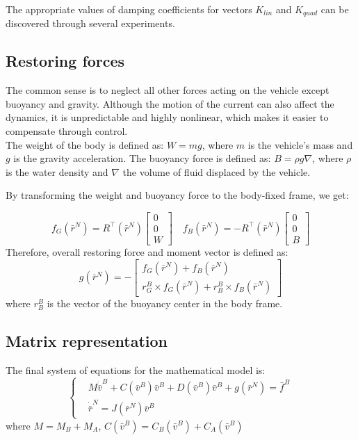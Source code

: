     The appropriate values of damping coefficients for vectors $K_{lin}$ and $K_{quad}$ can be discovered through several experiments.

\subsection{Restoring forces}

    The common sense is to neglect all other forces acting on the vehicle except buoyancy and gravity. 
    Although the motion of the current can also affect the dynamics, it is unpredictable and highly nonlinear, 
    which makes it easier to compensate through control.\\
    The weight of the body is defined as: $W=m g$, where $m$ is the vehicle's mass and $g$ is the gravity acceleration. 
    The buoyancy force is defined as: $B=\rho g \nabla$, where $\rho$ is the water density and $\nabla$ the volume of fluid displaced by the vehicle. 
    
    By transforming the weight and buoyancy force to the body-fixed frame, we get:

    $$
    f_G\left(\bar{r}^N\right)=R^{\top}\left(\bar{r}^N\right)\left[\begin{array}{l}
    0 \\
    0 \\
    W
    \end{array}\right] \quad f_B\left(\bar{r}^N\right)=-R^{\top}\left(\bar{r}^N\right)\left[\begin{array}{l}
    0 \\
    0 \\
    B
    \end{array}\right]
    $$
    Therefore, overall restoring force and moment vector is defined as:
    $$
    g(\bar{r}^N)=-\left[\begin{array}{c}
    f_G(\bar{r}^N)+f_B(\bar{r}^N) \\
    r_G^B \times f_G(\bar{r}^N)+r_B^B \times f_B(\bar{r}^N)
    \end{array}\right]
    $$
    where $r_B^B$ is the vector of the buoyancy center in the body frame. 

\subsection{Matrix representation}

    The final system of equations for the mathematical model is:
    $$
    \begin{cases}
    & M \dot{\bar{v}}^B + C(\bar{v}^B) \bar{v}^B+D(\bar{v}^B) \bar{v}^B+g(\bar{r}^N)= \bar{f}^B\\
    & \dot{\bar{r}}^N=J(\bar{r}^N) \bar{v}^B
    \end{cases}
    $$
    where
    $M=M_B+M_A$, $C(\bar{v}^B)=C_B(\bar{v}^B)+C_A(\bar{v}^B)$

